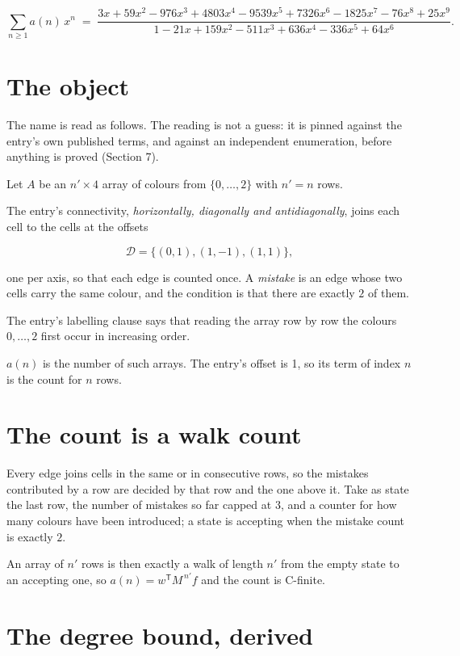 \documentclass[11pt]{article}
\theoremstyle{definition}
\begin{document}
\[\sum_{n \ge 1} a(n)\,x^n \;=\; \frac{3x + 59x^{2} - 976x^{3} + 4803x^{4} - 9539x^{5} + 7326x^{6} - 1825x^{7} - 76x^{8} + 25x^{9}}{1 - 21x + 159x^{2} - 511x^{3} + 636x^{4} - 336x^{5} + 64x^{6}}.\]

\section{The object}

The name is read as follows. The reading is not a guess: it is pinned against the entry's own published terms, and against an independent enumeration, before anything is proved (Section 7).

Let $A$ be an $n' \times 4$ array of colours from $\{0,\dots,2\}$ with $n' = n$ rows.

The entry's connectivity, {\itshape horizontally, diagonally and antidiagonally}, joins each cell to the cells at the offsets

\[\mathcal{D} = \{(0,1), (1,-1), (1,1)\},\]

one per axis, so that each edge is counted once. A {\itshape mistake} is an edge whose two cells carry the same colour, and the condition is that there are exactly $2$ of them.

The entry's labelling clause says that reading the array row by row the colours $0,\dots,2$ first occur in increasing order.

$a(n)$ is the number of such arrays. The entry's offset is 1, so its term of index $n$ is the count for $n$ rows.

\section{The count is a walk count}

Every edge joins cells in the same or in consecutive rows, so the mistakes contributed by a row are decided by that row and the one above it. Take as state the last row, the number of mistakes so far capped at $3$, and a counter for how many colours have been introduced; a state is accepting when the mistake count is exactly $2$.

An array of $n'$ rows is then exactly a walk of length $n'$ from the empty state to an accepting one, so $a(n) = w^{\mathsf T}M^{\,n'}f$ and the count is C-finite.

\section{The degree bound, derived}
\end{document}
